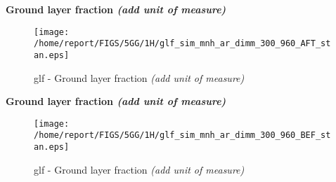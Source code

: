 \documentclass[11pt,english]{article}
\begin{document}
\begin{center}
\textbf{Ground layer fraction \textit{(add unit of measure)}}
\end{center}

\begin{figure}[htbp]
\centering
{\texttt{[image: /home/report/FIGS/5GG/1H/glf\_sim\_mnh\_ar\_dimm\_300\_960\_AFT\_stan.eps]}}
\caption{glf - Ground layer fraction \textit{(add unit of measure)}}\label{fig:glf1}
\end{figure}
\newpage

\begin{center}
\textbf{Ground layer fraction \textit{(add unit of measure)}}
\end{center}

\begin{figure}[htbp]
\centering
{\texttt{[image: /home/report/FIGS/5GG/1H/glf\_sim\_mnh\_ar\_dimm\_300\_960\_BEF\_stan.eps]}}
\caption{glf - Ground layer fraction \textit{(add unit of measure)}}\label{fig:glf2}
\end{figure}
\newpage
\end{document}
